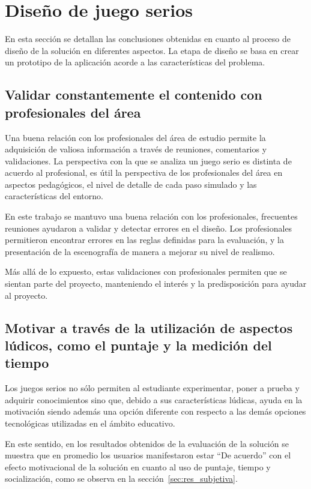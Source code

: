 \section{Diseño de juego serios}

En esta sección se detallan las conclusiones obtenidas en cuanto al proceso de
diseño de la solución en diferentes aspectos. La etapa de diseño se basa en 
crear un prototipo de la aplicación acorde a las características del problema.


\subsection{Validar constantemente el contenido con profesionales del área}

Una buena relación con los profesionales del área de estudio permite la
adquisición de valiosa información a través de reuniones, comentarios y
validaciones. La perspectiva con la que se analiza un juego serio es distinta de
acuerdo al profesional, es útil la perspectiva de los profesionales del área en
aspectos pedagógicos, el nivel de detalle de cada paso simulado y las
características del entorno.

En este trabajo se mantuvo una buena relación con los profesionales, frecuentes
reuniones ayudaron a validar y detectar errores en el diseño. Los profesionales
permitieron encontrar errores en las reglas definidas para la evaluación, y la
presentación de la escenografía de manera a mejorar su nivel de realismo.

Más allá de lo expuesto, estas validaciones con profesionales permiten que se
sientan parte del proyecto, manteniendo el interés y la predisposición para
ayudar al proyecto.


\subsection{Motivar a través de la utilización de aspectos lúdicos, como el
    puntaje y la medición del tiempo}


Los juegos serios no sólo permiten al estudiante experimentar, poner a prueba y
adquirir conocimientos sino que, debido a sus características lúdicas, ayuda en
la motivación siendo además una opción diferente con respecto a las demás
opciones tecnológicas utilizadas en el ámbito educativo.
    
En este sentido, en los resultados obtenidos de la evaluación de la solución se
muestra que en promedio los usuarios manifestaron estar \enquote{De acuerdo} con
el efecto motivacional de la solución en cuanto al uso de puntaje, tiempo y
socialización, como se observa en la sección~\ref{sec:res_subjetiva}.

